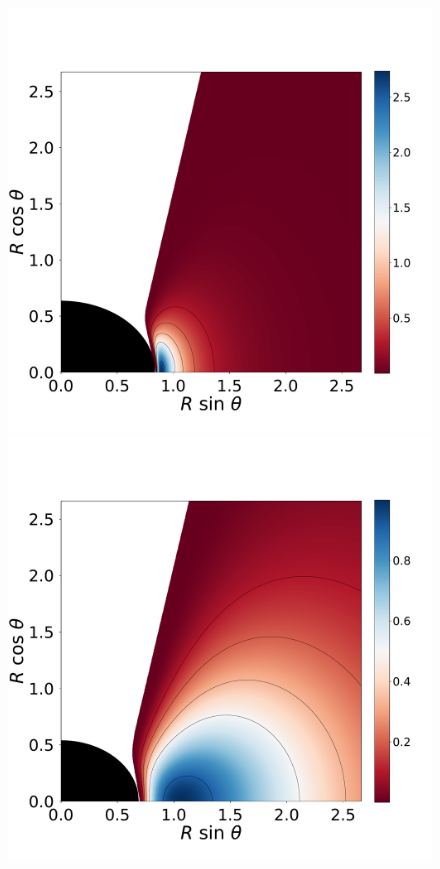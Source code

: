 \documentclass[twocolumn,aps,showpacs,showkeys,prd,superscriptaddress,byrevtex, amsmath]{revtex4-1}
\begin{document}
\begin{figure}
\hspace{-0.2cm}
\includegraphics[scale=0.14]{figures/fig3_III__10.pdf}
\\
\includegraphics[scale=0.14]{figures/fig3_IV_10.pdf}

\end{figure}
\end{document}
